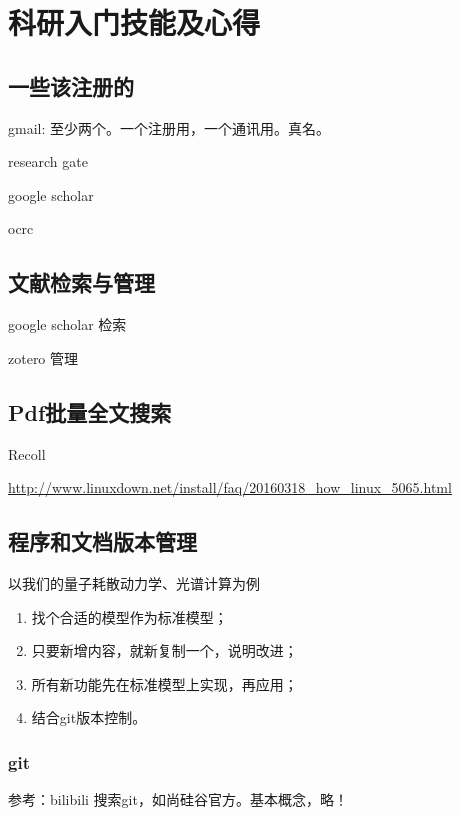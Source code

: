 \documentclass[a4paper,11pt,twoside]{book}
\begin{document}
\chapter{科研入门技能及心得}
\section{一些该注册的}
gmail: 至少两个。一个注册用，一个通讯用。真名。

research gate

google scholar

ocrc

\section{文献检索与管理}
google scholar 检索

zotero 管理

\section{Pdf批量全文搜索}
Recoll

\url{http://www.linuxdown.net/install/faq/20160318_how_linux_5065.html}



\section{程序和文档版本管理}
以我们的量子耗散动力学、光谱计算为例
\begin{enumerate}
\item 找个合适的模型作为标准模型；
\item 只要新增内容，就新复制一个，说明改进；
\item 所有新功能先在标准模型上实现，再应用；
\item 结合git版本控制。
\end{enumerate}



\subsection{git}
参考：bilibili 搜索git，如尚硅谷官方。基本概念，略！
\end{document}
